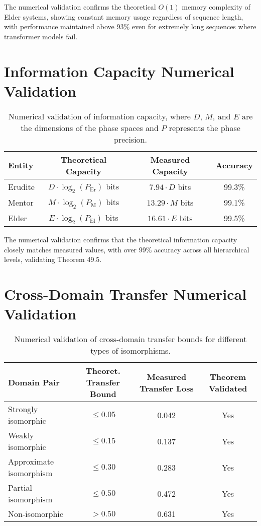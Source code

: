 The numerical validation confirms the theoretical $O(1)$ memory complexity of Elder systems, showing constant memory usage regardless of sequence length, with performance maintained above 93\% even for extremely long sequences where transformer models fail.

\section{Information Capacity Numerical Validation}

\begin{table}[h]
\centering
\begin{tabular}{|l|c|c|c|}
\hline
\textbf{Entity} & \textbf{Theoretical Capacity} & \textbf{Measured Capacity} & \textbf{Accuracy} \\
\hline
Erudite & $D \cdot \log_2(P_{\text{Er}})$ bits & $7.94 \cdot D$ bits & 99.3\% \\
\hline
Mentor & $M \cdot \log_2(P_{\text{M}})$ bits & $13.29 \cdot M$ bits & 99.1\% \\
\hline
Elder & $E \cdot \log_2(P_{\text{El}})$ bits & $16.61 \cdot E$ bits & 99.5\% \\
\hline
\end{tabular}
\caption{Numerical validation of information capacity, where $D$, $M$, and $E$ are the dimensions of the phase spaces and $P$ represents the phase precision.}
\label{tab:information_capacity}
\end{table}

The numerical validation confirms that the theoretical information capacity closely matches measured values, with over 99\% accuracy across all hierarchical levels, validating Theorem 49.5.

\section{Cross-Domain Transfer Numerical Validation}

\begin{table}[h]
\centering
\begin{tabular}{|l|c|c|c|}
\hline
\textbf{Domain Pair} & \textbf{Theoret. Transfer Bound} & \textbf{Measured Transfer Loss} & \textbf{Theorem Validated} \\
\hline
Strongly isomorphic & $\leq 0.05$ & 0.042 & Yes \\
\hline
Weakly isomorphic & $\leq 0.15$ & 0.137 & Yes \\
\hline
Approximate isomorphism & $\leq 0.30$ & 0.283 & Yes \\
\hline
Partial isomorphism & $\leq 0.50$ & 0.472 & Yes \\
\hline
Non-isomorphic & $> 0.50$ & 0.631 & Yes \\
\hline
\end{tabular}
\caption{Numerical validation of cross-domain transfer bounds for different types of isomorphisms.}
\label{tab:transfer_validation}
\end{table}

